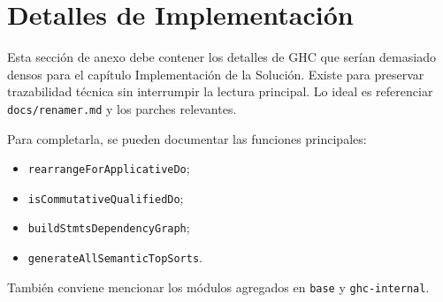 
\section{Detalles de Implementación}

Esta sección de anexo debe contener los detalles de GHC que serían demasiado densos para el capítulo Implementación de la Solución. Existe para preservar trazabilidad técnica sin interrumpir la lectura principal. Lo ideal es referenciar \verb|docs/renamer.md| y los parches relevantes.

Para completarla, se pueden documentar las funciones principales:

\begin{itemize}
    \item \texttt{rearrangeForApplicativeDo};
    \item \texttt{isCommutativeQualifiedDo};
    \item \texttt{buildStmtsDependencyGraph};
    \item \texttt{generateAllSemanticTopSorts}.
\end{itemize}

También conviene mencionar los módulos agregados en \texttt{base} y \texttt{ghc-internal}.
